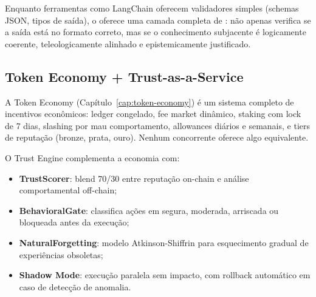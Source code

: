 \begin{table}[htb]
\centering
    \small
\caption{Scanners epistemológicos do OpenCode vs. alternativas}
\label{tab:scanners}
\end{table}

\noindent Enquanto ferramentas como LangChain oferecem validadores
simples (schemas JSON, tipos de saída), o \opencodeeco{} oferece uma
camada completa de : não apenas
verifica se a saída está no formato correto, mas se o conhecimento
subjacente é logicamente coerente, teleologicamente alinhado e
epistemicamente justificado.

\subsection{Token Economy + Trust-as-a-Service}

A Token Economy (Capítulo~\ref{cap:token-economy}) é um sistema completo
de incentivos econômicos: ledger congelado, fee market dinâmico, staking
com lock de 7 dias, slashing por mau comportamento, allowances diários
e semanais, e tiers de reputação (bronze, prata, ouro). Nenhum
concorrente oferece algo equivalente.

O Trust Engine complementa a economia com:
\begin{itemize}
    \item \textbf{TrustScorer}: blend 70/30 entre reputação on-chain
          e análise comportamental off-chain;
    \item \textbf{BehavioralGate}: classifica ações em segura, moderada,
          arriscada ou bloqueada antes da execução;
    \item \textbf{NaturalForgetting}: modelo Atkinson-Shiffrin para
          esquecimento gradual de experiências obsoletas;
    \item \textbf{Shadow Mode}: execução paralela sem impacto, com
          rollback automático em caso de detecção de anomalia.
\end{itemize}

